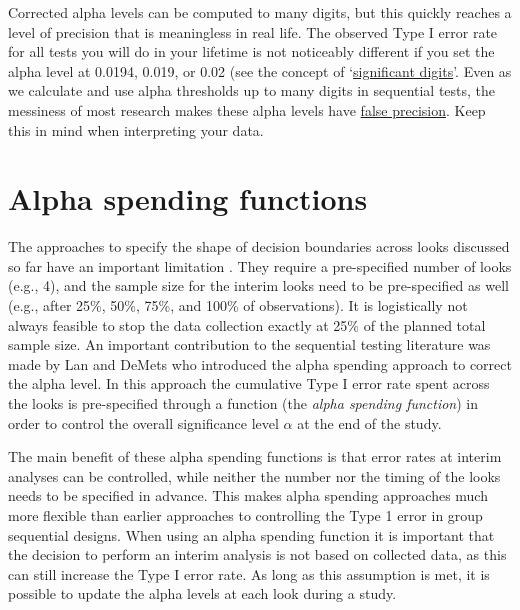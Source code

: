 \documentclass[
  oneside]{book}
\begin{document}
Corrected alpha levels can be computed to many digits, but this quickly reaches a level of precision that is meaningless in real life. The observed Type I error rate for all tests you will do in your lifetime is not noticeably different if you set the alpha level at 0.0194, 0.019, or 0.02 (see the concept of `\href{https://en.wikipedia.org/wiki/Significant_figures}{significant digits}'. Even as we calculate and use alpha thresholds up to many digits in sequential tests, the messiness of most research makes these alpha levels have \href{https://en.wikipedia.org/wiki/False_precision}{false precision}. Keep this in mind when interpreting your data.

\hypertarget{alpha-spending-functions}{%
\section{Alpha spending functions}\label{alpha-spending-functions}}

The approaches to specify the shape of decision boundaries across looks discussed so far have an important limitation \citep{proschan_statistical_2006}. They require a pre-specified number of looks (e.g., 4), and the sample size for the interim looks need to be pre-specified as well (e.g., after 25\%, 50\%, 75\%, and 100\% of observations). It is logistically not always feasible to stop the data collection exactly at 25\% of the planned total sample size. An important contribution to the sequential testing literature was made by Lan and DeMets \citeyearpar{lan_discrete_1983} who introduced the alpha spending approach to correct the alpha level. In this approach the cumulative Type I error rate spent across the looks is pre-specified through a function (the \emph{alpha spending function}) in order to control the overall significance level \(\alpha\) at the end of the study.

The main benefit of these alpha spending functions is that error rates at interim analyses can be controlled, while neither the number nor the timing of the looks needs to be specified in advance. This makes alpha spending approaches much more flexible than earlier approaches to controlling the Type 1 error in group sequential designs. When using an alpha spending function it is important that the decision to perform an interim analysis is not based on collected data, as this can still increase the Type I error rate. As long as this assumption is met, it is possible to update the alpha levels at each look during a study.
\end{document}
